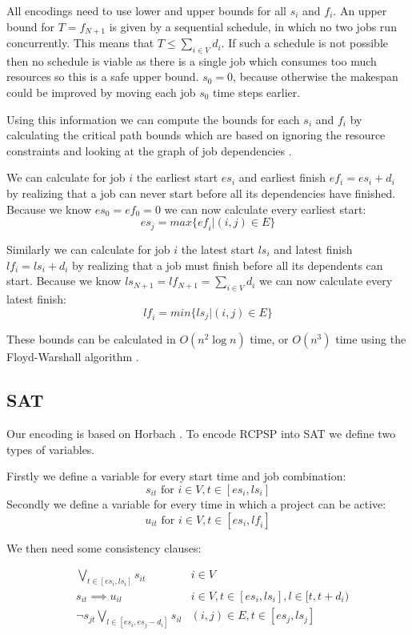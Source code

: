 \documentclass{sig-alternate}
\newcommand{\mli}[1]{\mathit{#1}}
\begin{document}
All encodings need to use lower and upper bounds for all $s_i$ and $f_i$.
An upper bound for $T = f_{N+1}$ is given by a sequential schedule, in which no two jobs run concurrently.
This means that $T \leq \sum_{i \in V}{d_i}$.
If such a schedule is not possible then no schedule is viable as there is a single job which consumes too much resources so this is a safe upper bound.
$s_0 = 0$, because otherwise the makespan could be improved by moving each job $s_0$ time steps earlier.

Using this information we can compute the bounds for each $s_i$ and $f_i$ by calculating the critical path bounds  which are based on ignoring the resource constraints and looking at the graph of job dependencies \cite{klein1999computing}.

We can calculate for job $i$ the earliest start $es_i$ and earliest finish $ef_i = es_i + d_i$ by realizing that a job can never start before all its dependencies have finished.
Because we know $es_0 = ef_0 = 0$ we can now calculate every earliest start:
$$\mli{es}_j = max\{\mli{ef}_i | (i,j) \in E\}$$

Similarly we can calculate for job $i$ the latest start $ls_i$ and latest finish $lf_i = ls_i + d_i$ by realizing that a job must finish before all its dependents can start.
Because we know $ls_{N+1} = lf_{N+1} = \sum_{i \in V}{d_i}$ we can now calculate every latest finish:
$$\mli{lf}_i = min\{\mli{ls}_j | (i,j) \in E\}$$

These bounds can be calculated in $O(n^2 \log n)$ time, or $O(n^3)$ time using the Floyd-Warshall algorithm \cite{horbach2010boolean}.

\subsection{SAT}

Our encoding is based on Horbach \cite{horbach2010boolean}.
To encode RCPSP into SAT we define two types of variables.

Firstly we define a variable for every start time and job combination:
\[s_{it} \text{ for } i \in V, t \in [\mli{es_i},\mli{ls_i}]\]
Secondly we define a variable for every time in which a project can be active:
$$u_{it} \text{ for } i \in V, t \in [\mli{es_i},\mli{lf_i}]$$

We then need some consistency clauses:

\begin{subequations}
\begin{align}
        & \bigvee_{t \in [\mli{es_i},\mli{ls_i}]} s_{it}& i \in V\\
        & s_{it} \implies u_{il} & i \in V, t \in [\mli{es_i},\mli{ls_i}], l \in [t,t+d_i)  \\
        & \neg s_{jt} \bigvee_{l \in [\mli{es_i}, \mli{es_j}-d_i]} s_{il} & (i,j) \in E, t \in [\mli{es_j},\mli{ls_j}]
\end{align}
\end{subequations}
\end{document}
